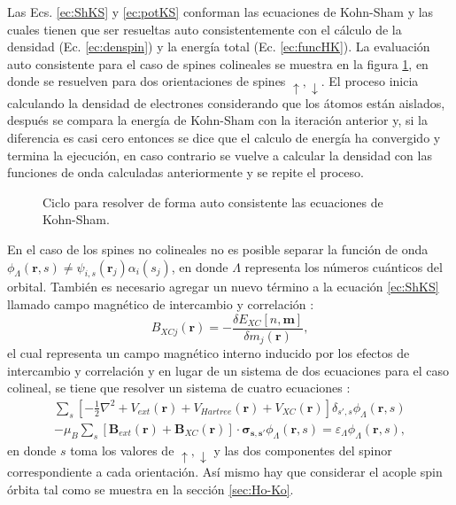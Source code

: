    Las Ecs. \ref{ec:ShKS} y \ref{ec:potKS} conforman las ecuaciones de Kohn-Sham y las cuales tienen que ser resueltas auto consistentemente con el c\'alculo de la densidad (Ec. \ref{ec:denspin}) y la energ\'ia total (Ec. \ref{ec:funcHK}). La evaluaci\'on  auto consistente para el caso de spines colineales se muestra en la figura \ref{fig:esq}, en donde se resuelven para dos orientaciones de spines $\uparrow, \downarrow$. El proceso inicia calculando la densidad de electrones considerando que los \'atomos est\'an aislados, despu\'es se compara la energ\'ia de Kohn-Sham con la iteraci\'on anterior y, si la diferencia es casi cero entonces se dice que el calculo de energ\'ia ha convergido y termina la ejecuci\'on, en caso contrario se vuelve a calcular la densidad con las funciones de onda calculadas anteriormente y se repite el proceso. 
   \begin{figure}[!hbt]
   	\centering
   	\caption[Diagrama de evaluaci\'on auto consistente]{Ciclo para resolver de forma auto consistente las ecuaciones de Kohn-Sham.}
   	\label{fig:esq}
   \end{figure}
   \newline
   \par En el caso de los spines no colineales no es posible separar la funci\'on de onda $\phi_{\Lambda} (\pmb{r},s)\not = \psi_{i,s } (\pmb{r}_j) \alpha_i (s_j) $, en donde $\Lambda$ representa los n\'umeros cu\'anticos  del orbital. Tambi\'en es necesario agregar un nuevo t\'ermino a la ecuaci\'on \ref{ec:ShKS} llamado campo magn\'etico de intercambio y correlaci\'on \cite{PhysRevB.37.10685}:
   \begin{equation*}
   B_{XCj} (\pmb{r}) = - \frac{\delta E_{XC} [n,\pmb{m}]}{\delta m_j (\pmb{r})} \label{ec:Bxc},
   \end{equation*}
   el cual representa un campo magn\'etico interno inducido por  los efectos de intercambio y correlaci\'on y en lugar de un sistema de dos ecuaciones  para el caso colineal, se tiene que resolver un sistema de cuatro ecuaciones \cite{MB-2015}:
   \begin{multline}
   \sum_{s}  \left[-\frac{1}{2} \nabla^2 + V_{ext} (\pmb{r})+ V_{Hartree} (\pmb{r}) + V_{XC} (\pmb{r}) \right] \delta_{s',s}  \phi_{\Lambda} (\pmb{r},s)\\ - \mu_{B} \sum_{s}  [\pmb{B}_{ext} (\pmb{r})+ \pmb{B}_{XC} (\pmb{r}) ] \cdot \pmb{\sigma_{s,s'}} \phi_{\Lambda} (\pmb{r},s) = \varepsilon_{\Lambda} \phi_{\Lambda} (\pmb{r},s) , \label{ec:KSnoColl}
   \end{multline}
   en donde $s$ toma los valores de $\uparrow, \downarrow$ y  las dos componentes del spinor correspondiente a cada orientaci\'on. As\'i mismo hay que considerar el acople spin \'orbita tal como se muestra en la secci\'on \ref{sec:Ho-Ko}.
